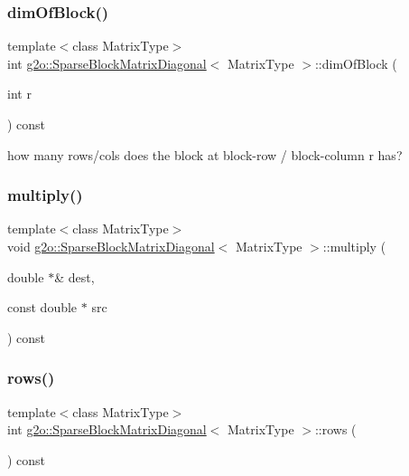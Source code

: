 \subsubsection{\texorpdfstring{dim\+Of\+Block()}{dimOfBlock()}}
{\footnotesize\ttfamily template$<$class Matrix\+Type$>$ \\
int \mbox{\hyperlink{classg2o_1_1_sparse_block_matrix_diagonal}{g2o\+::\+Sparse\+Block\+Matrix\+Diagonal}}$<$ Matrix\+Type $>$\+::dim\+Of\+Block (\begin{DoxyParamCaption}\item[{int}]{r }\end{DoxyParamCaption}) const\hspace{0.3cm}{\ttfamily [inline]}}



how many rows/cols does the block at block-\/row / block-\/column r has? 

\mbox{\label{classg2o_1_1_sparse_block_matrix_diagonal_ae7d969c12506cdcd1b7d54128f3b6985}} 
\subsubsection{\texorpdfstring{multiply()}{multiply()}}
{\footnotesize\ttfamily template$<$class Matrix\+Type$>$ \\
void \mbox{\hyperlink{classg2o_1_1_sparse_block_matrix_diagonal}{g2o\+::\+Sparse\+Block\+Matrix\+Diagonal}}$<$ Matrix\+Type $>$\+::multiply (\begin{DoxyParamCaption}\item[{double $\ast$\&}]{dest,  }\item[{const double $\ast$}]{src }\end{DoxyParamCaption}) const\hspace{0.3cm}{\ttfamily [inline]}}

\mbox{\label{classg2o_1_1_sparse_block_matrix_diagonal_af87f005cff6800ef0ce640d23fb651f8}} 
\subsubsection{\texorpdfstring{rows()}{rows()}}
{\footnotesize\ttfamily template$<$class Matrix\+Type$>$ \\
int \mbox{\hyperlink{classg2o_1_1_sparse_block_matrix_diagonal}{g2o\+::\+Sparse\+Block\+Matrix\+Diagonal}}$<$ Matrix\+Type $>$\+::rows (\begin{DoxyParamCaption}{ }\end{DoxyParamCaption}) const\hspace{0.3cm}{\ttfamily [inline]}}



